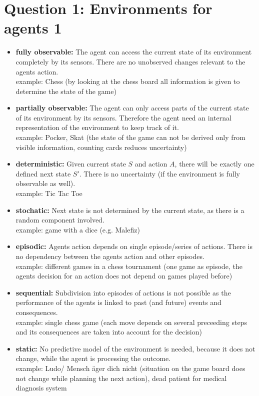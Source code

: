 \section*{Question 1: Environments for agents 1}
\begin{itemize}
\item \textbf{fully observable:} The agent can access the current state of its environment completely by its sensors. There are no unobserved changes relevant to the agents action.\\
example: Chess (by looking at the chess board all information is given to determine the state of the game)
\item \textbf{partially observable:} The agent can only access parts of the current state of its environment by its sensors. Therefore the agent need an internal representation of the environment to keep track of it.
\\
example: Pocker, Skat (the state of the game can not be derived only from visible information, counting cards reduces uncertainty)
\item \textbf{deterministic:} Given current state $S$ and action $A$, there will be exactly one defined next state $S'$. There is no uncertainty (if the environment is fully observable as well).\\
example: Tic Tac Toe
\item \textbf{stochatic:} Next state is not determined by the current state, as there is a random component involved.\\
example: game with a dice (e.g. Malefiz)
\item \textbf{episodic:} Agents action depends on single episode/series of actions. There is no dependency between the agents action and other episodes.\\
example: different games in a chess tournament (one game as episode, the agents decision for an action does not depend on games played before)
\item \textbf{sequential:} Subdivision into episodes of actions is not possible as the performance of the agents is linked to past (and future) events and consequences.\\
example: single chess game (each move depends on several preceeding steps and its consequences are taken into account for the decision) 
\item \textbf{static:} No predictive model of the environment is needed, because it does not change, while the agent is processing the outcome.\\
example: Ludo/ Mensch äger dich nicht (situation on the game board does not change while planning the next action), dead patient for medical diagnosis system

\end{itemize}

